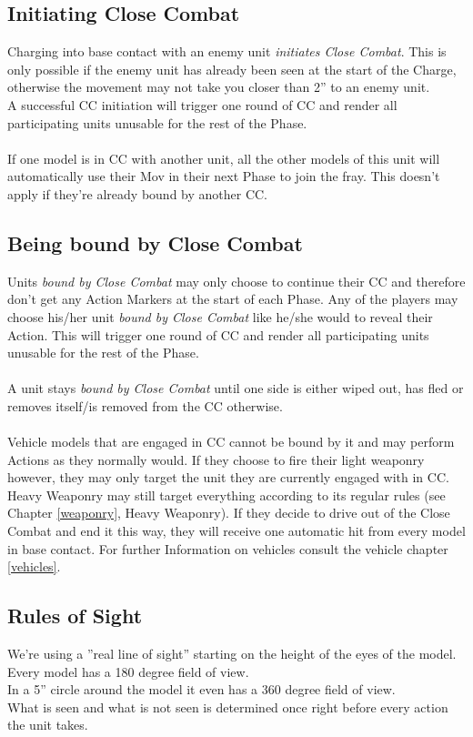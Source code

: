 \documentclass[
	11pt,
	toc=bibliography
	]{article}
\begin{document}
\subsection{Initiating Close Combat}\label{initiatingCloseCombat}
Charging into base contact with an enemy unit \textit{initiates Close Combat}. This is only possible if the enemy unit has already been seen at the start of the Charge, otherwise the movement may not take you closer than 2'' to an enemy unit. \\
A successful CC initiation will trigger one round of CC and render all participating units unusable for the rest of the Phase.\\\\
If one model is in CC with another unit, all the other models of this unit will automatically use their Mov in their next Phase to join the fray. This doesn't apply if they're already bound by another CC.\\

\subsection{Being bound by Close Combat}\label{beingBoundByCloseCombat}
Units \textit{bound by Close Combat} may only choose to continue their CC and therefore don't get any Action Markers at the start of each Phase. Any of the players may choose his/her unit \textit{bound by Close Combat} like he/she would to reveal their Action. This will trigger one round of CC and render all participating units unusable for the rest of the Phase.\\\\
A unit stays \textit{bound by Close Combat} until one side is either wiped out, has fled or removes itself/is removed from the CC otherwise.\\\\
Vehicle models that are engaged in CC cannot be bound by it and may perform Actions as they normally would. If they choose to fire their light weaponry however, they may only target the unit they are currently engaged with in CC. Heavy Weaponry may still target everything according to its regular rules (see Chapter \ref{weaponry}, Heavy Weaponry). If they decide to drive out of the Close Combat and end it this way, they will receive one automatic hit from every model in base contact. For further Information on vehicles consult the vehicle chapter \ref{vehicles}. 

\subsection{Rules of Sight}\label{rulesOfSight}
We're using a ''real line of sight'' starting on the height of the eyes of the model.\\
Every model has a 180 degree field of view.\\
In a 5'' circle around the model it even has a 360 degree field of view.\\
What is seen and what is not seen is determined once right before every action the unit takes.
\end{document}
